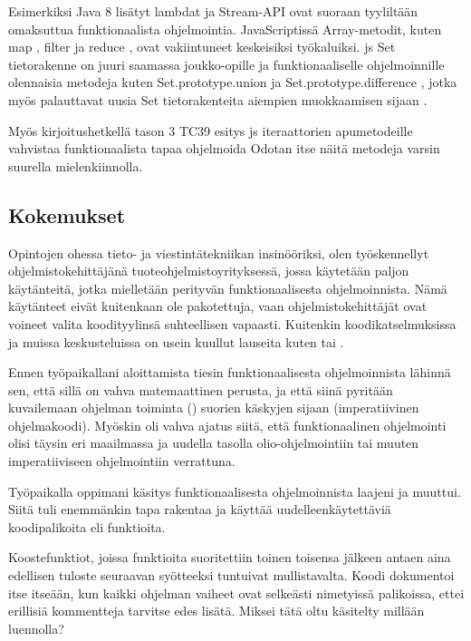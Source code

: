 Esimerkiksi Java 8 lisätyt lambdat \cite{oracle_function_package} ja Stream-API \cite{oracle_stream_api} ovat suoraan tyyliltään omaksuttua funktionaalista ohjelmointia. JavaScriptissä Array-metodit, kuten map \cite{mdn_array_map}, filter \cite{mdn_array_filter} ja reduce \cite{mdn_array_reduce}, ovat vakiintuneet keskeisiksi työkaluiksi. \gls{js} Set tietorakenne on juuri saamassa joukko-opille ja funktionaaliselle ohjelmoinnille olennaisia metodeja kuten Set.prototype.union \cite{mdn_set_union} ja Set.prototype.difference \cite{mdn_set_intersection}, jotka myös palauttavat uusia Set tietorakenteita aiempien muokkaamisen sijaan \cite{mdn_set_methods}.

Myös kirjoitushetkellä tason 3 TC39 esitys \gls{js} iteraattorien apumetodeille vahvistaa funktionaalista tapaa ohjelmoida \citep{tc39_iterator_helpers} Odotan itse näitä metodeja varsin suurella mielenkiinnolla.

\subsection{Kokemukset}


Opintojen ohessa tieto- ja viestintätekniikan insinööriksi, olen työskennellyt ohjelmistokehittäjänä tuoteohjelmistoyrityksessä, jossa käytetään paljon käytänteitä, jotka mielletään perityvän funktionaalisesta ohjelmoinnista. Nämä käytänteet eivät kuitenkaan ole pakotettuja, vaan ohjelmistokehittäjät ovat voineet valita koodityylinsä suhteellisen vapaasti. Kuitenkin koodikatselmuksissa ja muissa keskusteluissa on usein kuullut lauseita kuten  tai .

Ennen työpaikallani aloittamista tiesin funktionaalisesta ohjelmoinnista lähinnä sen, että sillä on vahva matemaattinen perusta, ja että siinä pyritään kuvailemaan ohjelman toiminta () suorien käskyjen sijaan (imperatiivinen ohjelmakoodi). Myöskin oli vahva ajatus siitä, että funktionaalinen ohjelmointi olisi täysin eri maailmassa ja uudella tasolla olio-ohjelmointiin tai muuten imperatiiviseen ohjelmointiin verrattuna.

Työpaikalla oppimani käsitys funktionaalisesta ohjelmoinnista laajeni ja muuttui. Siitä tuli enemmänkin tapa rakentaa ja käyttää uudelleenkäytettäviä koodipalikoita eli funktioita.

Koostefunktiot, joissa funktioita suoritettiin toinen toisensa jälkeen antaen aina edellisen tuloste seuraavan syötteeksi tuntuivat mullistavalta. Koodi dokumentoi itse itseään, kun kaikki ohjelman vaiheet ovat selkeästi nimetyissä palikoissa, ettei erillisiä kommentteja tarvitse edes lisätä. Miksei tätä oltu käsitelty millään luennolla?

